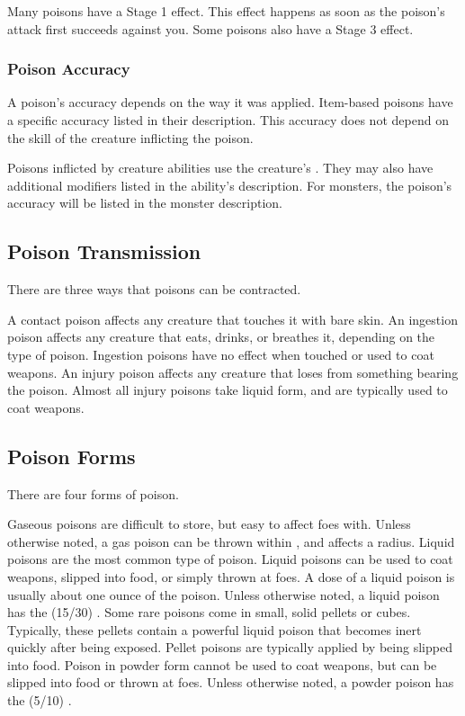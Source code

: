       Many poisons have a Stage 1 effect.
      This effect happens as soon as the poison's attack first succeeds against you.
      Some poisons also have a Stage 3 effect.

    \subsubsection{Poison Accuracy}
      A poison's accuracy depends on the way it was applied.
      Item-based poisons have a specific accuracy listed in their description.
      This accuracy does not depend on the skill of the creature inflicting the poison.

      Poisons inflicted by creature abilities use the creature's .
      They may also have additional modifiers listed in the ability's description.
      For monsters, the poison's accuracy will be listed in the monster description.

  \subsection{Poison Transmission}\label{Poison Transmission}\label{Transmission}

    There are three ways that poisons can be contracted.

     A contact poison affects any creature that touches it with bare skin.
     An ingestion poison affects any creature that eats, drinks, or breathes it, depending on the type of poison.
    Ingestion poisons have no effect when touched or used to coat weapons.
     An injury poison affects any creature that loses  from something bearing the poison.
    Almost all injury poisons take liquid form, and are typically used to coat weapons.

  \subsection{Poison Forms}\label{Poison Forms}

    There are four forms of poison.

     Gaseous poisons are difficult to store, but easy to affect foes with.
    Unless otherwise noted, a gas poison can be thrown within \shortrange, and affects a \tinyarea radius.
     Liquid poisons are the most common type of poison.
    Liquid poisons can be used to coat weapons, slipped into food, or simply thrown at foes.
    A dose of a liquid poison is usually about one ounce of the poison.
    Unless otherwise noted, a liquid poison has the  (15/30) .
     Some rare poisons come in small, solid pellets or cubes.
    Typically, these pellets contain a powerful liquid poison that becomes inert quickly after being exposed.
    Pellet poisons are typically applied by being slipped into food.
     Poison in powder form cannot be used to coat weapons, but can be slipped into food or thrown at foes.
    Unless otherwise noted, a powder poison has the  (5/10) .

